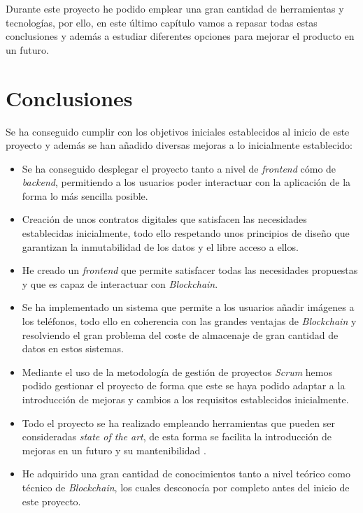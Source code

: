 
Durante este proyecto he podido emplear una gran cantidad de herramientas y tecnologías, por ello, en este último capítulo vamos a repasar todas estas conclusiones y además a estudiar diferentes opciones para mejorar el producto en un futuro.

\section{Conclusiones}

Se ha conseguido cumplir con los objetivos iniciales establecidos al inicio de este proyecto y además se han añadido diversas mejoras a lo inicialmente establecido:
\begin{itemize}
    \item Se ha conseguido desplegar el proyecto tanto a nivel de \textit{frontend} cómo de \textit{backend}, permitiendo a los usuarios poder interactuar con la aplicación de la forma lo más sencilla posible.
    \item Creación de unos contratos digitales que satisfacen las necesidades establecidas inicialmente, todo ello respetando unos principios de diseño que garantizan la inmutabilidad de los datos y el libre acceso a ellos.
    \item He creado un  \textit{frontend} que permite satisfacer todas las necesidades propuestas y que es capaz de interactuar con \textit{Blockchain}.
    \item Se ha implementado un sistema que permite a los usuarios añadir imágenes a los teléfonos, todo ello en coherencia con las grandes ventajas de \textit{Blockchain} y resolviendo el gran problema del coste 
    de almacenaje de gran cantidad de datos en estos sistemas.
    \item Mediante el uso de la metodología de gestión de proyectos \textit{Scrum} hemos podido gestionar el proyecto de forma que este se haya podido adaptar a la introducción de mejoras y cambios a los requisitos establecidos inicialmente.
    \item Todo el proyecto se ha realizado empleando herramientas que pueden ser consideradas \textit{state of the art}, de esta forma se facilita la introducción de mejoras en un futuro y su mantenibilidad .
    \item He adquirido una gran cantidad de conocimientos tanto a  nivel teórico  como técnico de \textit{Blockchain}, los cuales desconocía por completo antes del inicio de este proyecto.

\end{itemize}
